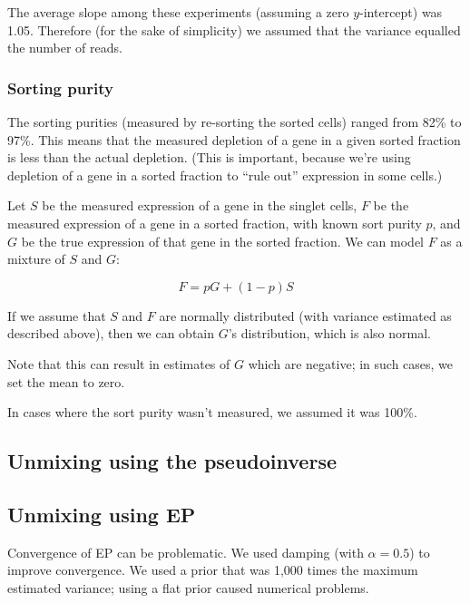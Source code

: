 \documentclass{article}
\begin{document}
The average slope among these experiments (assuming a zero $y$-intercept) was 1.05.
Therefore (for the sake of simplicity)
we assumed that the variance equalled the number of reads.

\subsubsection*{Sorting purity}

The sorting purities (measured by re-sorting the sorted cells) ranged from 82\% to 97\%.
This means that the measured depletion of a gene in a given sorted fraction is less than
the actual depletion. (This is important, because we're using depletion of a gene in a
sorted fraction to ``rule out'' expression in some cells.)

Let $S$ be the measured expression of a gene in the singlet cells,
$F$ be the
measured expression of a gene in a sorted fraction, with known sort purity $p$, and
$G$ be the true expression of that gene in the sorted fraction.
We can model $F$ as a mixture of $S$ and $G$:

\[
F = pG + (1-p)S
\]

If we assume that $S$ and $F$ are normally distributed (with variance estimated as described
above), then we can obtain $G$'s distribution, which is also normal.

Note that this can result in estimates of $G$ which are negative; in such
cases, we set the mean to zero.

In cases where the sort purity wasn't measured, we assumed it was 100\%.

\subsection*{Unmixing using the pseudoinverse}




\subsection*{Unmixing using EP}

Convergence of EP can be problematic. We 
used damping (with $\alpha = 0.5$) to improve convergence.
We used a prior that was 1,000 times the maximum estimated variance; using a flat
prior caused numerical problems.
\end{document}
